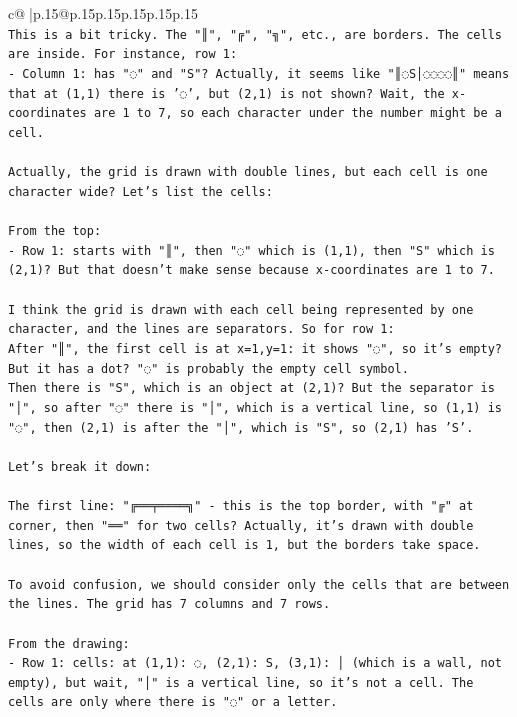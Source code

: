 \documentclass{article}
\begin{document}
{\begin{supertabular}{c@{$\;$}|p{.15\linewidth}@{}p{.15\linewidth}p{.15\linewidth}p{.15\linewidth}p{.15\linewidth}p{.15\linewidth}}
{{{\\ 
\texttt{This is a bit tricky. The "║", "╔", "╗", etc., are borders. The cells are inside. For instance, row 1: } \\
\texttt{{-} Column 1: has "◌" and "S"? Actually, it seems like "║◌S│◌◌◌◌║" means that at (1,1) there is '◌', but (2,1) is not shown? Wait, the x{-}coordinates are 1 to 7, so each character under the number might be a cell.} \\
\\ 
\texttt{Actually, the grid is drawn with double lines, but each cell is one character wide? Let's list the cells:} \\
\\ 
\texttt{From the top:} \\
\texttt{{-} Row 1: starts with "║", then "◌" which is (1,1), then "S" which is (2,1)? But that doesn't make sense because x{-}coordinates are 1 to 7.} \\
\\ 
\texttt{I think the grid is drawn with each cell being represented by one character, and the lines are separators. So for row 1:} \\
\texttt{After "║", the first cell is at x=1,y=1: it shows "◌", so it's empty? But it has a dot? "◌" is probably the empty cell symbol.} \\
\texttt{Then there is "S", which is an object at (2,1)? But the separator is "│", so after "◌" there is "│", which is a vertical line, so (1,1) is "◌", then (2,1) is after the "│", which is "S", so (2,1) has 'S'.} \\
\\ 
\texttt{Let's break it down:} \\
\\ 
\texttt{The first line: "╔══╤════╗" {-} this is the top border, with "╔" at corner, then "══" for two cells? Actually, it's drawn with double lines, so the width of each cell is 1, but the borders take space.} \\
\\ 
\texttt{To avoid confusion, we should consider only the cells that are between the lines. The grid has 7 columns and 7 rows.} \\
\\ 
\texttt{From the drawing:} \\
\texttt{{-} Row 1: cells: at (1,1): ◌, (2,1): S, (3,1): │ (which is a wall, not empty), but wait, "│" is a vertical line, so it's not a cell. The cells are only where there is "◌" or a letter.} \\
}}}
\end{supertabular}}
\end{document}

